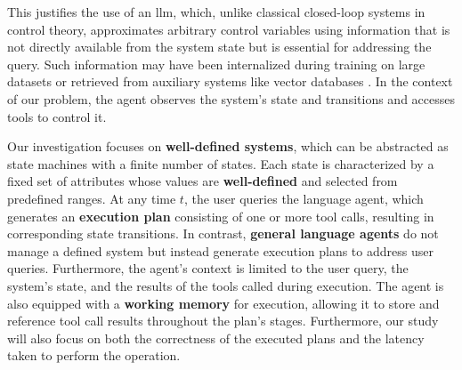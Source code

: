 \pskip



\pskip

This justifies the use of an \gls{llm}, which, unlike classical closed-loop systems in control theory, approximates arbitrary control variables using information that is not directly available from the system state but is essential for addressing the query. Such information may have been internalized during training on large datasets or retrieved from auxiliary systems like vector databases \cite{tonmoy2024comprehensive}\cite{zhang2023retrieve}. In the context of our problem, the agent observes the system's state and transitions and accesses tools to control it.

\pskip

Our investigation focuses on \textbf{well-defined systems}, which can be abstracted as state machines with a finite number of states. Each state is characterized by a fixed set of attributes whose values are \textbf{well-defined} and selected from predefined ranges. At any time $t$, the user queries the language agent, which generates an \textbf{execution plan} consisting of one or more tool calls, resulting in corresponding state transitions. In contrast, \textbf{general language agents} do not manage a defined system but instead generate execution plans to address user queries. Furthermore, the agent's context is limited to the user query, the system's state, and the results of the tools called during execution. The agent is also equipped with a \textbf{working memory} for execution, allowing it to store and reference tool call results throughout the plan's stages. Furthermore, our study will also focus on both the correctness of the executed plans and the latency taken to perform the operation.